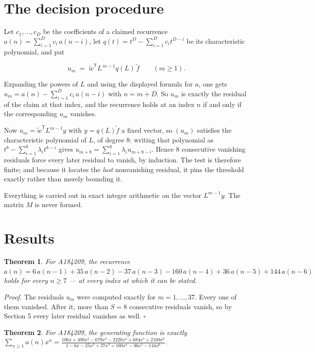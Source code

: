 \documentclass[11pt]{article}
\newtheorem{theorem}{Theorem}
\theoremstyle{definition}
\begin{document}
\section{The decision procedure}

Let $c_1,\dots,c_D$ be the coefficients of a claimed recurrence $a(n) = \sum_{i=1}^{D} c_i\,a(n-i)$, let $q(t) = t^{D} - \sum_{i=1}^{D} c_i t^{D-i}$ be its characteristic polynomial, and put

\[u_m \;=\; \tilde w^{\mathsf T} L^{\,m-1} q(L)\,\tilde f \qquad (m \ge 1).\]

Expanding the powers of $L$ and using the displayed formula for $a$, one gets $u_m = a(n) - \sum_{i=1}^{D} c_i\,a(n-i)$ with $n = m + D$. So $u_m$ is exactly the residual of the claim at that index, and the recurrence holds at an index $n$ if and only if the corresponding $u_m$ vanishes.

Now $u_m = \tilde w^{\mathsf T} L^{m-1} y$ with $y = q(L)\tilde f$ a fixed vector, so $(u_m)$ satisfies the characteristic polynomial of $L$, of degree $8$: writing that polynomial as $t^{8} - \sum_{i=1}^{8} \lambda_i t^{8-i}$ gives $u_{m+8} = \sum_{i=1}^{8} \lambda_i u_{m+8-i}$. Hence $8$ consecutive vanishing residuals force every later residual to vanish, by induction. The test is therefore finite; and because it locates the {\itshape last} nonvanishing residual, it pins the threshold exactly rather than merely bounding it.

Everything is carried out in exact integer arithmetic on the vector $L^{m-1}y$. The matrix $M$ is never formed.

\section{Results}

\begin{theorem} For A184209, the recurrence $a(n) = 6\,a(n-1) + 35\,a(n-2) - 37\,a(n-3) - 160\,a(n-4) + 36\,a(n-5) + 144\,a(n-6)$ holds for every $n \ge 7$ --- at every index at which it can be stated.\end{theorem}

{\itshape Proof.} The residuals $u_m$ were computed exactly for $m = 1,\dots,37$. Every one of them vanished. After it, more than $S = 8$ consecutive residuals vanish, so by Section 5 every later residual vanishes as well. $\square$

\begin{theorem} For A184209, the generating function is exactly $\sum_{n\ge 1} a(n)x^n = \frac{106x + 400x^{2} - 679x^{3} - 2220x^{4} + 684x^{5} + 2160x^{6}}{1 - 6x - 35x^{2} + 37x^{3} + 160x^{4} - 36x^{5} - 144x^{6}}$.\end{theorem}
\end{document}
